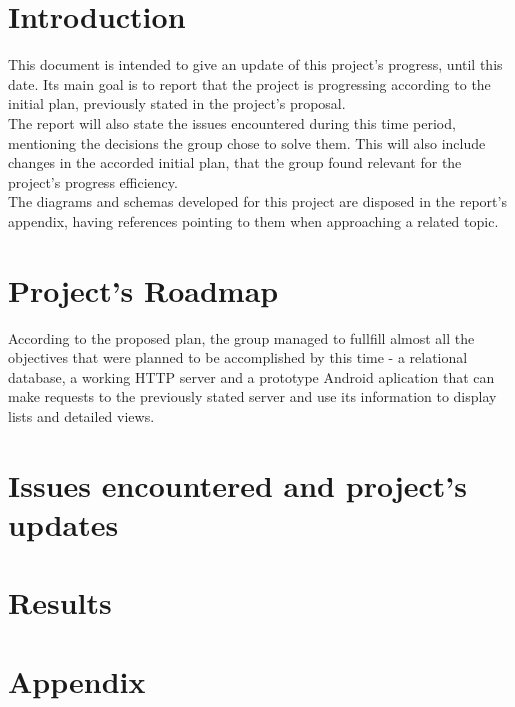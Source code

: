 \documentclass{article}
\begin{document}
\section{Introduction}

This document is intended to give an update of this project's progress, until this date. 
Its main goal is to report that the project is progressing according to the
initial plan, previously stated in the project's proposal.\\

The report will also state the issues encountered during this time period, mentioning the 
decisions the group chose to solve them. This will also include changes in the accorded
initial plan, that the group found relevant for the project's progress efficiency.\\

The diagrams and schemas developed for this project are disposed in the report's appendix,
having references pointing to them when approaching a related topic.

\section{Project's Roadmap}

According to the proposed plan, the group managed to fullfill almost all the objectives
that were planned to be accomplished by this time - a relational database, a working HTTP server
and a prototype Android aplication that can make requests to the previously stated server and 
use its information to display lists and detailed views.

\section{Issues encountered and project's updates}

\section{Results}

\section{Appendix}
\end{document}
